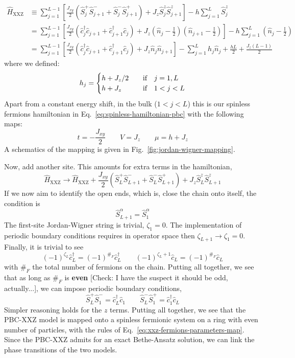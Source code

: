 \[
	\begin{aligned}
		\hat H_\mathrm{XXZ} &\equiv \sum_{j=1}^{L-1} \left[
			\frac{J_{xy}}{2} \left( 
				\hat S_j^+ \hat S_{j+1}^- + \hat S_j^- \hat S_{j+1}^+
			\right) + J_z \hat S_j^z \hat S_{j+1}^z
		\right] - h \sum_{j=1}^L \hat S_j^z \\
		&= \sum_{j=1}^{L-1} \left[
			\frac{J_{xy}}{2} \left(
				\hat c_j^\dagger \hat c_{j+1} + \hat c_{j+1}^\dagger \hat c_j
			\right) + J_z \left(
				\hat n_j - \frac{\mathbb{I}}{2}
			\right) \left(
				\hat n_{j+1} - \frac{\mathbb{I}}{2}
			\right)
		\right] - h \sum_{j=1}^L \left(
			\hat n_{j} - \frac{\mathbb{I}}{2}
		\right) \\
		&= \sum_{j=1}^{L-1} \left[
			\frac{J_{xy}}{2} \left(
				\hat c_j^\dagger \hat c_{j+1} + \hat c_{j+1}^\dagger \hat c_j
			\right) + J_z \hat n_j \hat n_{j+1}
		\right] - \sum_{j=1}^L h_j \hat n_{j}
		+ \frac{hL}{2} + \frac{J_z (L-1)}{2}
	\end{aligned}
\]
where we defined:
\[
	h_j = \begin{cases}
		h + J_z/2 &\qq{if} j=1,L \\
		h + J_z &\qq{if} 1<j<L
	\end{cases}
\]
Apart from a constant energy shift, in the bulk ($1<j<L$) this is our spinless fermions hamiltonian in Eq.~\eqref{eq:spinless-hamiltonian-pbc} with the following maps:
\begin{equation}\label{eq:xxz-fermions-parameters-map}
	t = -\frac{J_{xy}}{2}
	\qquad
	V = J_z
	\qquad
	\mu = h + J_z
\end{equation}
A schematics of the mapping is given in Fig.~\ref{fig:jordan-wigner-mapping}.

Now, add another site. This amounts for extra terms in the hamiltonian,
\[
	\hat H_\mathrm{XXZ} \to \hat H_\mathrm{XXZ} + \frac{J_{xy}}{2} \left( 
		\hat S_L^+ \hat S_{L+1}^- + \hat S_L^- \hat S_{L+1}^+
	\right) + J_z \hat S_L^z \hat S_{L+1}^z
\]
If we now aim to identify the open ends, which is, close the chain onto itself, the condition is
\[
	\hat S_{L+1}^\alpha = \hat S_1^\alpha
\]
The first-site Jordan-Wigner string is trivial, $\zeta_1 = 0$. The implementation of periodic boundary conditions requires in operator space then $\zeta_{L+1} \to \zeta_1 = 0$. Finally, it is trivial to see
\[
	(-1)^{\zeta_L} \hat c_L^\dagger = (-1)^{\#_F} \hat c_L^\dagger
	\qquad
	(-1)^{\zeta_L+1} \hat c_L = (-1)^{\#_F} \hat c_L
\]
with $\#_F$ the total number of fermions on the chain. Putting all together, we see that as long as $\#_F$ is \textbf{even} {\color{tabred}[Check: I have the suspect it should be odd, actually...]}, we can impose periodic boundary conditions,
\[
	\hat S_L^+ \hat S_1^- = \hat c_L^\dagger \hat c_1
	\qquad
	\hat S_L^- \hat S_1^+ = \hat c_1^\dagger \hat c_L
\]
Simpler reasoning holds for the $z$ terms. Putting all together, we see that the PBC-$\mathrm{XXZ}$ model is mapped onto a spinless fermionic system on a ring with even number of particles, with the rules of Eq.~\eqref{eq:xxz-fermions-parameters-map}. Since the PBC-$\mathrm{XXZ}$ admits for an exact Bethe-Ansatz solution, we can link the phase transitions of the two models.

